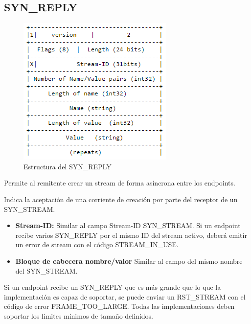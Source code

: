 \subsection{SYN\_REPLY}
\begin{figure}[H] %
\includegraphics[scale=1]{synreply.png}  %
\centering
\caption{Estructura del SYN\_REPLY} \label{fig:figura4}
\end{figure}
Permite al remitente crear un stream de forma asíncrona entre los endpoints.

Indica la aceptación de una corriente de creación por parte del receptor de un SYN\_STREAM. 
\begin{itemize}
\item \textbf{Stream-ID:} Similar al campo Stream-ID SYN\_STREAM.
Si un endpoint recibe varios SYN\_REPLY por el mismo ID del stream activo, deberá emitir un error de stream con el código STREAM\_IN\_USE. 
\item \textbf{Bloque de cabecera nombre/valor} Similar al campo del mismo nombre del SYN\_STREAM.
\end{itemize}
Si un endpoint recibe un SYN\_REPLY que es más grande que lo que la implementación es capaz de soportar, se puede enviar un RST\_STREAM con el código de error FRAME\_TOO\_LARGE. Todas las implementaciones deben soportar los límites mínimos de tamaño definidos.

